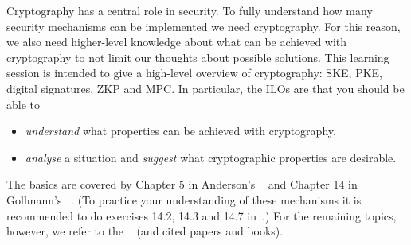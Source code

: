 Cryptography has a central role in security.
To fully understand how many security mechanisms can be implemented we need 
cryptography.
For this reason, we also need higher-level knowledge about what can be achieved 
with cryptography to not limit our thoughts about possible solutions.
This learning session is intended to give a high-level overview of 
cryptography: \ac{SKE}, \ac{PKE}, digital signatures, \ac{ZKP} and \ac{MPC}.
In particular, the \acp{ILO} are that you should be able to
\begin{itemize}
  \item \emph{understand} what properties can be achieved with cryptography.
  \item \emph{analyse} a situation and \emph{suggest} what cryptographic 
    properties are desirable.
\end{itemize}

The basics are covered by
Chapter 5 in Anderson's ~\cite{Anderson2008sea} and
Chapter 14 in Gollmann's ~\cite{Gollmann2011cs}.
(To practice your understanding of these mechanisms it is recommended to do 
exercises 14.2, 14.3 and 14.7 in~\cite{Gollmann2011cs}.)
For the remaining topics, however, we refer to the ~\cite{EOCS} 
(and cited papers and books).
